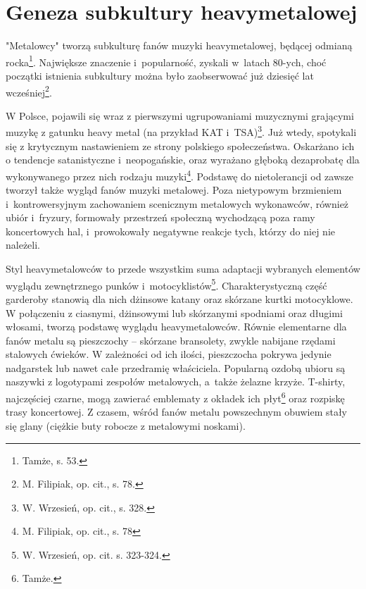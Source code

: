 \documentclass[12pt, a4paper, titlepage]{report}
\begin{document}



\section{Geneza subkultury heavymetalowej}
"Metalowcy" tworzą subkulturę fanów muzyki heavymetalowej, będącej odmianą rocka\footnote{Tamże, s. 53.}. Największe znaczenie i~popularność, zyskali w~latach 80-ych, choć początki istnienia subkultury można było zaobserwować już dziesięć lat wcześniej\footnote{M. Filipiak, op. cit., s. 78.}. 

W Polsce, pojawili się wraz z pierwszymi ugrupowaniami muzycznymi grającymi muzykę z gatunku heavy metal (na przykład KAT i~TSA)\footnote{W. Wrzesień, op. cit., s. 328.}. Już wtedy, spotykali się z krytycznym nastawieniem ze strony polskiego społeczeństwa. Oskarżano ich o tendencje satanistyczne i~neopogańskie, oraz wyrażano głęboką dezaprobatę dla wykonywanego przez nich rodzaju muzyki\footnote{M. Filipiak, op. cit., s. 78}. 
Podstawę do nietolerancji od zawsze tworzył także wygląd fanów muzyki metalowej. Poza nietypowym brzmieniem i~kontrowersyjnym zachowaniem scenicznym metalowych wykonawców, również ubiór i~fryzury, formowały przestrzeń społeczną wychodzącą poza ramy koncertowych hal, i~prowokowały negatywne reakcje tych, którzy do niej nie należeli. 
 
Styl heavymetalowców to przede wszystkim suma adaptacji wybranych elementów wyglądu zewnętrznego punków i~motocyklistów\footnote{W. Wrzesień, op. cit. s. 323-324.}. Charakterystyczną część garderoby stanowią dla nich dżinsowe katany oraz skórzane kurtki motocyklowe. W połączeniu z ciasnymi, dżinsowymi lub skórzanymi spodniami oraz długimi włosami, tworzą podstawę wyglądu heavymetalowców. Równie elementarne dla fanów metalu są pieszczochy -- skórzane bransolety, zwykle nabijane rzędami stalowych ćwieków. W zależności od ich ilości, pieszczocha pokrywa jedynie nadgarstek lub nawet całe przedramię właściciela. Popularną ozdobą ubioru są naszywki z logotypami zespołów metalowych, a~także żelazne krzyże. T-shirty, najczęściej czarne, mogą zawierać emblematy z okładek ich płyt\footnote{Tamże.} oraz rozpiskę trasy koncertowej. 
Z czasem, wśród fanów metalu powszechnym obuwiem stały się glany (ciężkie buty robocze z metalowymi noskami). 
\end{document}
